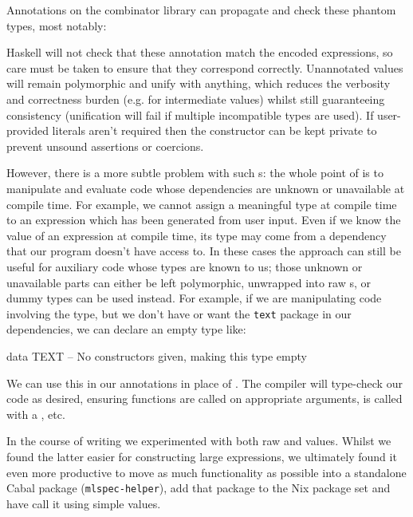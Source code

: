 Annotations on the combinator library can propagate and check these phantom
types, most notably:


Haskell will not check that these annotation match the encoded expressions, so
care must be taken to ensure that they correspond correctly. Unannotated values
will remain polymorphic and unify with anything, which reduces the verbosity and
correctness burden (e.g. for intermediate values) whilst still guaranteeing
consistency (unification will fail if multiple incompatible types are used). If
user-provided literals aren't required then the  constructor can be kept
private to prevent unsound assertions or coercions.

However, there is a more subtle problem with such s: the whole
point of \nixeval{} is to manipulate and evaluate code whose dependencies are
unknown or unavailable at compile time. For example, we cannot assign a
meaningful type at compile time to an expression which has been generated from
user input. Even if we know the value of an expression at compile time, its type
may come from a dependency that our program doesn't have access to. In these
cases the  approach can still be useful for auxiliary code whose
types are known to us; those unknown or unavailable parts can either be left
polymorphic, unwrapped into raw s, or dummy types can be used instead.
For example, if we are manipulating code involving the  type,
but we don't have or want the \texttt{text} package in our dependencies, we can
declare an empty type like:

\begin{haskell}
data TEXT  -- No constructors given, making this type empty
\end{haskell}

We can use this in our annotations in place of . The compiler
will type-check our code as desired, ensuring functions are called on
appropriate arguments,  is called with a , etc.

In the course of writing \mlspec{} we experimented with both raw  and
 values. Whilst we found the latter easier for constructing large
expressions, we ultimately found it even more productive to move as much
functionality as possible into a standalone Cabal package
(\texttt{mlspec-helper}), add that package to the Nix package set and have
\mlspec{} call it using simple  values.
